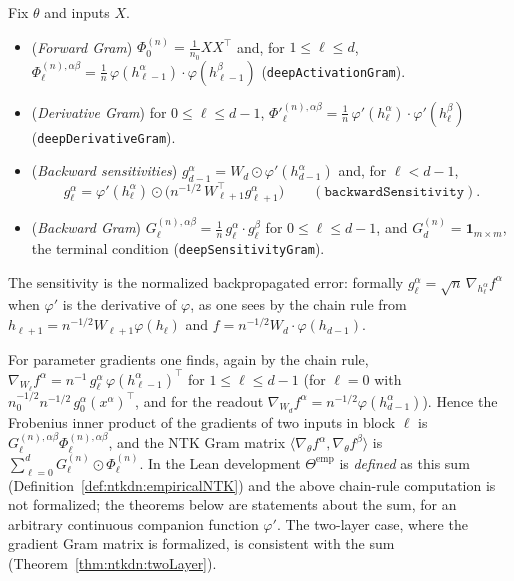 \begin{definition}\label{def:ntkdn:gram}
  \leanok
Fix $\theta$ and inputs $X$.
\begin{itemize}
  \item (\emph{Forward Gram}) $\Phi_0^{(n)}=\frac1{n_0}XX^\top$ and, for $1\le\ell\le d$, $\Phi_\ell^{(n),\alpha\beta}=\frac1n\,\varphi(h_{\ell-1}^\alpha)\cdot\varphi(h_{\ell-1}^\beta)$ (\texttt{deepActivationGram}).
  \item (\emph{Derivative Gram}) for $0\le\ell\le d-1$, $\Phi'^{(n),\alpha\beta}_\ell=\frac1n\,\varphi'(h_\ell^\alpha)\cdot\varphi'(h_\ell^\beta)$ (\texttt{deepDerivativeGram}).
  \item (\emph{Backward sensitivities}) $g_{d-1}^\alpha=W_d\odot\varphi'(h_{d-1}^\alpha)$ and, for $\ell<d-1$,
    \[ g_\ell^\alpha=\varphi'(h_\ell^\alpha)\odot\bigl(n^{-1/2}\,W_{\ell+1}^\top g_{\ell+1}^\alpha\bigr)\qquad(\texttt{backwardSensitivity}). \]
  \item (\emph{Backward Gram}) $G_\ell^{(n),\alpha\beta}=\frac1n\,g_\ell^\alpha\cdot g_\ell^\beta$ for $0\le\ell\le d-1$, and $G_d^{(n)}=\mathbf 1_{m\times m}$, the terminal condition (\texttt{deepSensitivityGram}).
\end{itemize}
\end{definition}

The sensitivity is the normalized backpropagated error: formally $g_\ell^\alpha=\sqrt n\,\nabla_{h_\ell^\alpha}f^\alpha$ when $\varphi'$ is the derivative of $\varphi$, as one sees by the chain rule from $h_{\ell+1}=n^{-1/2}W_{\ell+1}\varphi(h_\ell)$ and $f=n^{-1/2}W_d\cdot\varphi(h_{d-1})$.

\begin{remark}\label{rmk:ntkdn:chainRule}
For parameter gradients one finds, again by the chain rule, $\nabla_{W_\ell}f^\alpha=n^{-1}\,g_\ell^\alpha\,\varphi(h_{\ell-1}^\alpha)^\top$ for $1\le\ell\le d-1$ (for $\ell=0$ with $n_0^{-1/2}n^{-1/2}\,g_0^\alpha(x^\alpha)^\top$, and for the readout $\nabla_{W_d}f^\alpha=n^{-1/2}\varphi(h_{d-1}^\alpha)$). Hence the Frobenius inner product of the gradients of two inputs in block $\ell$ is $G_\ell^{(n),\alpha\beta}\Phi_\ell^{(n),\alpha\beta}$, and the NTK Gram matrix $\langle\nabla_\theta f^\alpha,\nabla_\theta f^\beta\rangle$ is $\sum_{\ell=0}^dG_\ell^{(n)}\odot\Phi_\ell^{(n)}$. In the Lean development $\Theta^{\mathrm{emp}}$ is \emph{defined} as this sum (Definition~\ref{def:ntkdn:empiricalNTK}) and the above chain-rule computation is not formalized; the theorems below are statements about the sum, for an arbitrary continuous companion function $\varphi'$. The two-layer case, where the gradient Gram matrix is formalized, is consistent with the sum (Theorem~\ref{thm:ntkdn:twoLayer}).
\end{remark}

